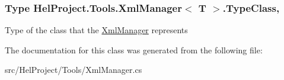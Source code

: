 \subsubsection[{Type\+Class}]{\setlength{\rightskip}{0pt plus 5cm}Type {\bf Hel\+Project.\+Tools.\+Xml\+Manager}$<$ T $>$.Type\+Class\hspace{0.3cm}{\ttfamily [get]}, {\ttfamily [set]}}\label{class_hel_project_1_1_tools_1_1_xml_manager_a4c29b7a37cf80588e6bc8a45626262a5}


Type of the class that the \hyperlink{class_hel_project_1_1_tools_1_1_xml_manager}{Xml\+Manager} represents 



The documentation for this class was generated from the following file\+:\begin{DoxyCompactItemize}
\item 
src/\+Hel\+Project/\+Tools/Xml\+Manager.\+cs\end{DoxyCompactItemize}
